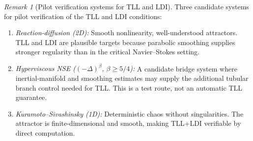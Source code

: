 \documentclass[12pt,a4paper]{article}
\theoremstyle{definition}
\theoremstyle{plain}
\theoremstyle{remark}
\newtheorem{remark}[definition]{Remark}
\begin{document}
\begin{remark}[Pilot verification systems for TLL and LDI]
\label{rem:pilot-verification}
Three candidate systems for pilot verification of the TLL and LDI conditions:
\begin{enumerate}
\item \emph{Reaction-diffusion (2D):} Smooth nonlinearity, well-understood attractors. TLL and LDI are plausible targets because parabolic smoothing supplies stronger regularity than in the critical Navier--Stokes setting.
\item \emph{Hyperviscous NSE ($(-\Delta)^\beta$, $\beta \geq 5/4$):} A candidate bridge system where inertial-manifold and smoothing estimates may supply the additional tubular branch control needed for TLL. This is a test route, not an automatic TLL guarantee.
\item \emph{Kuramoto--Sivashinsky (1D):} Deterministic chaos without singularities. The attractor is finite-dimensional and smooth, making TLL+LDI verifiable by direct computation.
\end{enumerate}
\end{remark}
\end{document}
